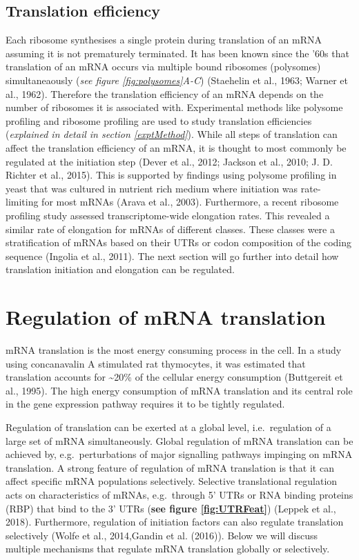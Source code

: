 \documentclass[12pt,openany]{book}
\begin{document}
\subsection{Translation efficiency}

Each ribosome synthesises a single protein during translation of an mRNA
assuming it is not prematurely terminated. It has been known since the
'60s that translation of an mRNA occurs via multiple bound ribosomes
(polysomes) simultaneaously (\emph{see figure \ref{fig:polysomes}A-C})
(Staehelin et al., 1963; Warner et al., 1962). Therefore the translation
efficiency of an mRNA depends on the number of ribosomes it is
associated with. Experimental methods like polysome profiling and
ribosome profiling are used to study translation efficiencies
(\emph{explained in detail in section \ref{exptMethod}}). While all
steps of translation can affect the translation efficiency of an mRNA,
it is thought to most commonly be regulated at the initiation step
(Dever et al., 2012; Jackson et al., 2010; J. D. Richter et al., 2015).
This is supported by findings using polysome profiling in yeast that was
cultured in nutrient rich medium where initiation was rate-limiting for
most mRNAs (Arava et al., 2003). Furthermore, a recent ribosome
profiling study assessed transcriptome-wide elongation rates. This
revealed a similar rate of elongation for mRNAs of different classes.
These classes were a stratification of mRNAs based on their UTRs or
codon composition of the coding sequence (Ingolia et al., 2011). The
next section will go further into detail how translation initiation and
elongation can be regulated. \newline
\section{Regulation of mRNA translation} \label{regmRNA}

mRNA translation is the most energy consuming process in the cell. In a
study using concanavalin A stimulated rat thymocytes, it was estimated
that translation accounts for \textasciitilde{}20\% of the cellular
energy consumption (Buttgereit et al., 1995). The high energy
consumption of mRNA translation and its central role in the gene
expression pathway requires it to be tightly regulated.

Regulation of translation can be exerted at a global level,
i.e.~regulation of a large set of mRNA simultaneously. Global regulation
of mRNA translation can be achieved by, e.g.~perturbations of major
signalling pathways impinging on mRNA translation. A strong feature of
regulation of mRNA translation is that it can affect specific mRNA
populations selectively. Selective translational regulation acts on
characteristics of mRNAs, e.g.~through 5' UTRs or RNA binding proteins
(RBP) that bind to the 3' UTRs (\textbf{see figure \ref{fig:UTRFeat}})
(Leppek et al., 2018). Furthermore, regulation of initiation factors can
also regulate translation selectively (Wolfe et al., 2014,Gandin et al.
(2016)). Below we will discuss multiple mechanisms that regulate mRNA
translation globally or selectively.
\end{document}
